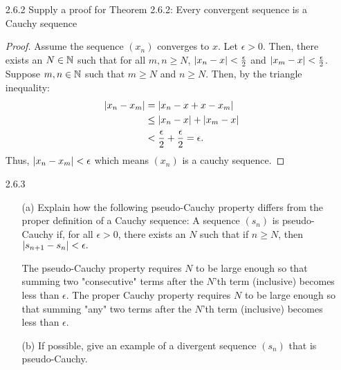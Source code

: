 \documentclass[12pt,letterpaper]{article}
\begin{document}
\begin{itemize}[leftmargin=!,labelindent=5pt]
\begin{proof}
            First, choose $k=1$ and pick $a_{n_1}$ to add to the subsequence such that $a_{n_1} \in (s - \frac{1}{1}, s]$.

            Next, choose $k>1$ and pick $a_{n_k}$ to add to the subsequence such that $a_{n_k} \in (s - \frac{1}{k}, s]$.

            Repeating the 2nd step while always choosing $k$ such that it is strictly greater than the previous choice will result in a subsequence of $(a_n)$ which converges to $s$ as the $\frac{1}{k}$ term becomes smaller.
            To verify, choose $\epsilon_0 > 0$ arbitrarily and choose $N > \frac{1}{\epsilon_0}$. Then, for all $t \geq N$, $\frac{1}{t} < \epsilon_0$ implies $\abs{s - a_{n_t}} < \frac{1}{t} < \epsilon_0$.
            Thus, we see that this subsequence converges to $s$ as desired.
        \end{proof}
    \item [2.6.2] Supply a proof for Theorem 2.6.2: Every convergent sequence is a Cauchy sequence
        \begin{proof}
            Assume the sequence $(x_n)$ converges to $x$.
            Let $\epsilon > 0$.
            Then, there exists an $N \in \mathbb{N}$ such that for all $m,n \geq N$, $\abs{x_n - x} < \frac{\epsilon}{2}$ and $\abs{x_m - x} < \frac{\epsilon}{2}$.
            Suppose $m, n \in \mathbb{N}$ such that $m \geq N$ and $n \geq N$.
            Then, by the triangle inequality:
            \begin{align*}
                \abs{x_n - x_m} &= \abs{x_n - x + x - x_m}\\
                &\leq \abs{x_n - x} + \abs{x_m - x}\\
                &< \frac{\epsilon}{2} + \frac{\epsilon}{2} = \epsilon.
            \end{align*}
            Thus, $\abs{x_n - x_m} < \epsilon$ which means $(x_n)$ is a cauchy sequence.
        \end{proof}
    \item [2.6.3]
        \begin{itemize}
            \item [(a)] Explain how the following pseudo-Cauchy property differs from the proper definition of a Cauchy sequence: A sequence $(s_n)$ is pseudo-Cauchy if, for all $\epsilon > 0$, there exists an $N$ such that if $n \geq N$, then $\abs{s_{n+1} - s_n} < \epsilon.$

                The pseudo-Cauchy property requires $N$ to be large enough so that summing two "consecutive" terms after the $N$'th term (inclusive) becomes less than $\epsilon$.
                The proper Cauchy property requires $N$ to be large enough so that summing "any" two terms after the $N$'th term (inclusive) becomes less than $\epsilon$.
            \item [(b)] If possible, give an example of a divergent sequence $(s_n)$ that is pseudo-Cauchy.
            

\end{itemize}
\end{itemize}
\end{document}
